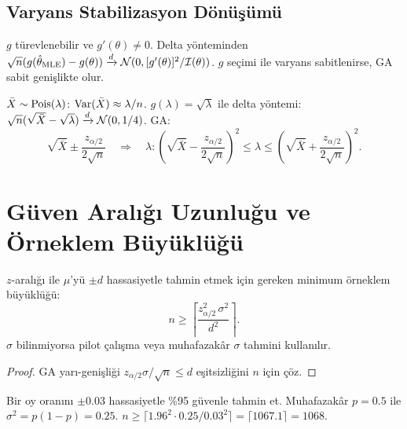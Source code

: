 \subsection{Varyans Stabilizasyon Dönüşümü}

\begin{teorem}\label{thm:delta_ga}
$g$ türevlenebilir ve $g'(\theta)\neq0$. Delta yönteminden $\sqrt{n}(g(\hat{\theta}_{\text{MLE}})-g(\theta))\xrightarrow{d}\mathcal{N}(0,[g'(\theta)]^2/\mathcal{I}(\theta))$. $g$ seçimi ile varyans sabitlenirse, GA sabit genişlikte olur.
\end{teorem}

\begin{ornek}
$\bar{X}\sim\operatorname{Pois}(\lambda)$: $\operatorname{Var}(\bar{X})\approx\lambda/n$. $g(\lambda)=\sqrt{\lambda}$ ile delta yöntemi: $\sqrt{n}(\sqrt{\bar{X}}-\sqrt{\lambda})\xrightarrow{d}\mathcal{N}(0,1/4)$. GA:
\[
  \sqrt{\bar{X}} \pm \frac{z_{\alpha/2}}{2\sqrt{n}} \quad\Rightarrow\quad
  \lambda: \left(\sqrt{\bar{X}} - \frac{z_{\alpha/2}}{2\sqrt{n}}\right)^{\!2} \leq \lambda \leq \left(\sqrt{\bar{X}} + \frac{z_{\alpha/2}}{2\sqrt{n}}\right)^{\!2}.
\]
\end{ornek}

\section{Güven Aralığı Uzunluğu ve Örneklem Büyüklüğü}
\label{sec:ga_uzunluk}

\begin{teorem}\label{thm:orneklem_buyuklugu}
$z$-aralığı ile $\mu$'yü $\pm d$ hassasiyetle tahmin etmek için gereken minimum örneklem büyüklüğü:
\[
  n \geq \left\lceil \frac{z_{\alpha/2}^2\,\sigma^2}{d^2} \right\rceil.
\]
$\sigma$ bilinmiyorsa pilot çalışma veya muhafazakâr $\sigma$ tahmini kullanılır.
\end{teorem}

\begin{proof}
GA yarı-genişliği $z_{\alpha/2}\sigma/\sqrt{n}\leq d$ eşitsizliğini $n$ için çöz.
\end{proof}

\begin{ornek}
Bir oy oranını $\pm0.03$ hassasiyetle \%95 güvenle tahmin et. Muhafazakâr $p=0.5$ ile $\sigma^2=p(1-p)=0.25$. $n\geq\lceil 1.96^2\cdot0.25/0.03^2\rceil = \lceil 1067.1\rceil = 1068$.
\end{ornek}

